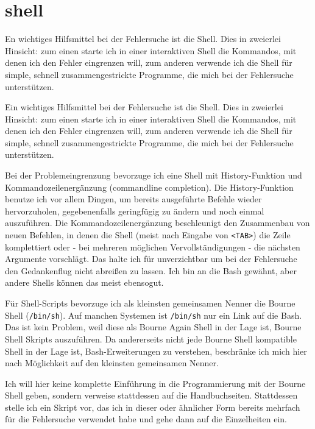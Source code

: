 \section{shell}
\label{sec:lokal-werkzeuge-shell}
\begin{abstractsec}
  En wichtiges Hilfsmittel bei der Fehlersuche ist die Shell. Dies in
  zweierlei Hinsicht: zum einen starte ich in einer interaktiven Shell die
  Kommandos, mit denen ich den Fehler eingrenzen will, zum anderen verwende
  ich die Shell für simple, schnell zusammengestrickte Programme, die mich bei
  der Fehlersuche unterstützen.
\end{abstractsec}
\begin{normaltext}
  Ein wichtiges Hilfsmittel bei der Fehlersuche ist die Shell. Dies in
  zweierlei Hinsicht: zum einen starte ich in einer interaktiven Shell die
  Kommandos, mit denen ich den Fehler eingrenzen will, zum anderen verwende
  ich die Shell für simple, schnell zusammengestrickte Programme, die mich bei
  der Fehlersuche unterstützen.

  Bei der Problemeingrenzung bevorzuge ich eine Shell mit History-Funktion und
  Kommandozeilenergänzung (commandline completion).
  Die History-Funktion benutze ich vor allem Dingen, um bereits ausgeführte
  Befehle wieder hervorzuholen, gegebenenfalls geringfügig zu ändern und noch
  einmal auszuführen. Die Kommandozeilenergänzung beschleunigt den Zusammenbau
  von neuen Befehlen, in denen die Shell (meist nach Eingabe von \verb?<TAB>?)
  die Zeile komplettiert oder - bei mehreren möglichen Vervollständigungen -
  die nächsten Argumente vorschlägt. Das halte ich für unverzichtbar um bei
  der Fehlersuche den Gedankenflug nicht abreißen zu lassen.
  Ich bin an die Bash gewähnt, aber andere Shells können das meist ebensogut.

  Für Shell-Scripts bevorzuge ich als kleinsten gemeinsamen Nenner die Bourne
  Shell (\verb?/bin/sh?). Auf manchen Systemen ist \verb?/bin/sh? nur ein Link
  auf die Bash. Das ist kein Problem, weil diese als Bourne Again Shell in der
  Lage ist, Bourne Shell Skripts auszuführen. Da andererseits nicht jede
  Bourne Shell kompatible Shell in der Lage ist, Bash-Erweiterungen zu
  verstehen, beschränke ich mich hier nach Möglichkeit auf den kleinsten
  gemeinsamen Nenner.

  Ich will hier keine komplette Einführung in die Programmierung mit der
  Bourne Shell geben, sondern verweise stattdessen auf die Handbuchseiten.
  Stattdessen stelle ich ein Skript vor, das ich in dieser oder ähnlicher Form
  bereits mehrfach für die Fehlersuche verwendet habe und gehe dann auf die
  Einzelheiten ein.


\end{normaltext}
